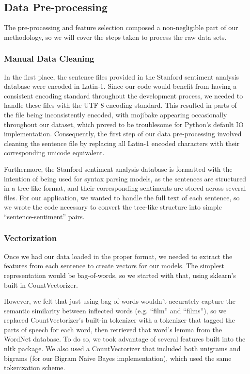 \documentclass[conference]{IEEEtran}
\begin{document}
\subsection{Data Pre-processing}

The pre-processing and feature selection composed a non-negligible part of our methodology, so we will cover the steps taken to process the raw data sets. 

\subsubsection{Manual Data Cleaning}

In the first place, the sentence files provided in the Stanford sentiment analysis database were encoded in Latin-1. Since our code would benefit from having a consistent encoding standard throughout the development process, we needed to handle these files with the UTF-8 encoding standard. This resulted in parts of the file being inconsistently encoded, with mojibake appearing occasionally throughout our dataset, which proved to be troublesome for Python's default IO implementation. Consequently, the first step of our data pre-processing involved cleaning the sentence file by replacing all Latin-1 encoded characters with their corresponding unicode equivalent.

Furthermore, the Stanford sentiment analysis database is formatted with the intention of being used for syntax parsing models, as the sentences are structured in a tree-like format, and their corresponding sentiments are stored across several files. For our application, we wanted to handle the full text of each sentence, so we wrote the code necessary to convert the tree-like structure into simple ``sentence-sentiment'' pairs.

\subsubsection{Vectorization}

Once we had our data loaded in the proper format, we needed to extract the features from each sentence to create vectors for our models. The simplest representation would be bag-of-words, so we started with that, using sklearn's built in CountVectorizer.

However, we felt that just using bag-of-words wouldn't accurately capture the semantic similarity between inflected words (e.g. ``film'' and ``films''), so we replaced CountVectorizer's built-in tokenizer with a tokenizer that tagged the parts of speech for each word, then retrieved that word's lemma from the WordNet database. To do so, we took advantage of several features built into the nltk package. We also used a CountVectorizer that included both unigrams and bigrams (for our Bigram Naive Bayes implementation), which used the same tokenization scheme.
\end{document}
